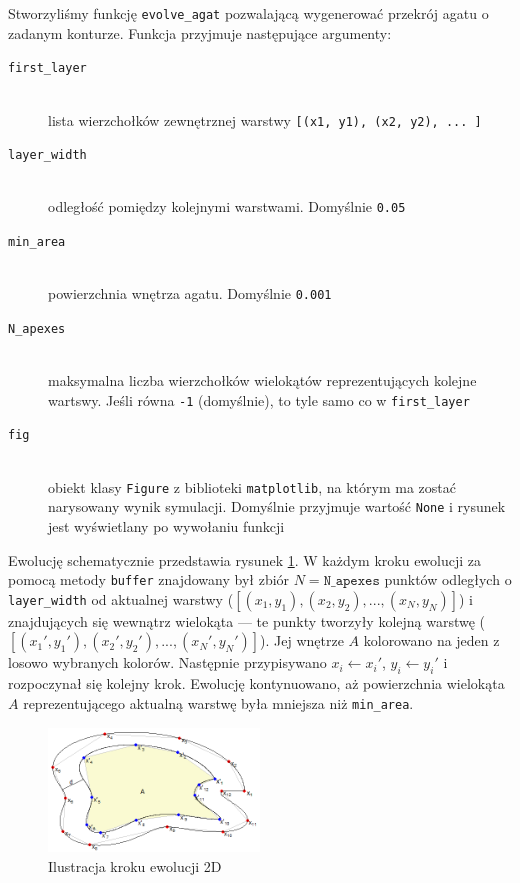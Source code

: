 \documentclass{article}
\begin{document}
Stworzyliśmy funkcję \texttt{evolve\_agat} pozwalającą wygenerować przekrój agatu o zadanym konturze. Funkcja przyjmuje następujące argumenty:
\begin{description}
\item[\texttt{first\_layer}] \hfill \\
lista wierzchołków zewnętrznej warstwy \texttt{[(x1, y1), (x2, y2), ... ]}
\item[\texttt{layer\_width}] \hfill \\
odległość pomiędzy kolejnymi warstwami. Domyślnie \texttt{0.05}
\item[\texttt{min\_area}] \hfill \\
powierzchnia wnętrza agatu. Domyślnie \texttt{0.001}
\item[\texttt{N\_apexes}] \hfill \\
maksymalna liczba wierzchołków wielokątów reprezentujących kolejne wartswy. Jeśli równa \texttt{-1} (domyślnie), to tyle samo co w \texttt{first\_layer}
\item[\texttt{fig}] \hfill \\
obiekt klasy \texttt{Figure} z biblioteki \texttt{matplotlib}, na którym ma zostać narysowany wynik symulacji. Domyślnie przyjmuje wartość \texttt{None} i rysunek jest wyświetlany po wywołaniu funkcji
\end{description}

Ewolucję schematycznie przedstawia rysunek \ref{ewolucja_2d}. W każdym kroku ewolucji za pomocą metody \texttt{buffer} znajdowany był zbiór $N=\texttt{N\_apexes}$ punktów odległych o \texttt{layer\_width} od aktualnej warstwy ($[(x_1,y_1), (x_2, y_2), ..., (x_N, y_N)]$) i znajdujących się wewnątrz wielokąta --- te punkty tworzyły kolejną warstwę ($[(x_1',y_1'), (x_2', y_2'), ..., (x_N', y_N')]$). Jej wnętrze $A$ kolorowano na jeden z losowo wybranych kolorów. Następnie przypisywano $x_i \leftarrow x_i'$, $y_i \leftarrow y_i'$ i rozpoczynał się kolejny krok. Ewolucję kontynuowano, aż powierzchnia wielokąta $A$ reprezentującego aktualną warstwę była mniejsza niż \texttt{min\_area}.
\begin{figure}[H]
\caption{Ilustracja kroku ewolucji 2D}
\label{ewolucja_2d}
\centering
\includegraphics[width=0.5\textwidth]{obrazy/ewolucja2d.png}
\end{figure}
\end{document}
